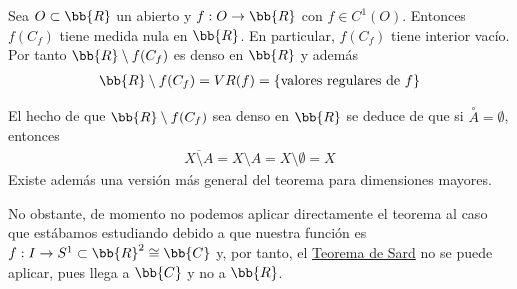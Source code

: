 \begin{teo}\label{teo:sard}
    Sea $O\subset \bb{R}$ un abierto y $f:O\to \bb{R}$ con $f\in C^1(O)$. Entonces $f(C_f)$ tiene medida nula en $\bb{R}$. En particular, $f(C_f)$ tiene interior vacío. Por tanto $\bb{R}\setminus f(C_f)$ es denso en $\bb{R}$ y además 
    \begin{gather*}
        \bb{R}\setminus f(C_f) = VR(f) = \{\text{valores regulares de $f$}\}
    \end{gather*}
\end{teo}

\begin{observacion}
    El hecho de que $\bb{R}\setminus f(C_f)$ sea denso en $\bb{R}$ se deduce de que si $\overset{\circ}{A}=\emptyset$, entonces 
    \begin{gather*}
        \overline{X\setminus A} = X\setminus A = X\setminus \emptyset = X
    \end{gather*}
    Existe además una versión más general del teorema para dimensiones mayores.
\end{observacion}

No obstante, de momento no podemos aplicar directamente el teorema al caso que estábamos estudiando debido a que nuestra función es $f:I \to S^1 \subset \bb{R}^2 \cong \bb{C}$ y, por tanto, el \hyperref[teo:sard]{Teorema de Sard} no se puede aplicar, pues llega a $\bb{C}$ y no a $\bb{R}$.\\

